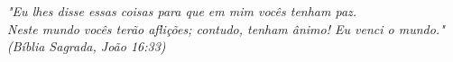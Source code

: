 \begin{epigrafe}
    \vspace*{\fill}
 	\begin{flushright}
		\textit{"Eu lhes disse essas coisas para que em mim vocês tenham paz. \\ 
		Neste mundo vocês terão aflições; contudo, tenham ânimo! Eu venci o mundo." \\
		(Bíblia Sagrada, João 16:33)}
	\end{flushright}
\end{epigrafe}
